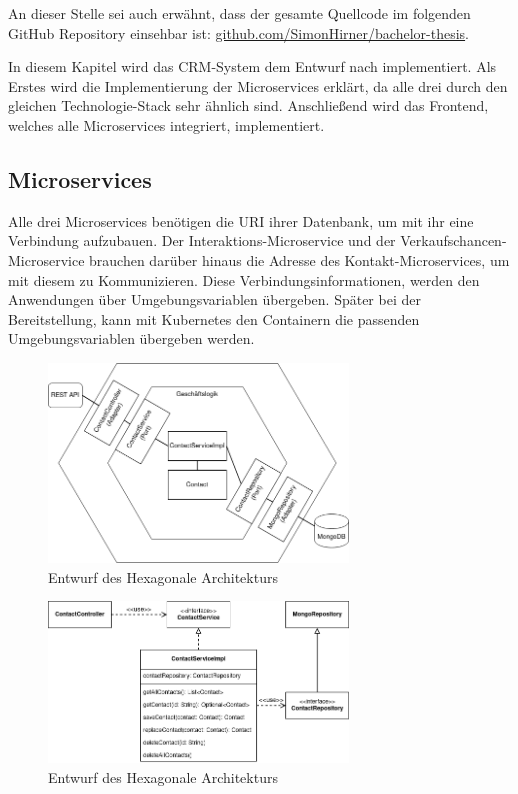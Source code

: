 An dieser Stelle sei auch erwähnt, dass der gesamte Quellcode im folgenden GitHub Repository einsehbar ist: \href{https://github.com/SimonHirner/bachelor-thesis}{github.com/SimonHirner/bachelor-thesis}.

In diesem Kapitel wird das CRM-System dem Entwurf nach implementiert. Als Erstes wird die Implementierung der Microservices erklärt, da alle drei durch den gleichen Technologie-Stack sehr ähnlich sind. Anschließend wird das Frontend, welches alle Microservices integriert, implementiert.

\subsection{Microservices}

Alle drei Microservices benötigen die \ac{URI} ihrer Datenbank, um mit ihr eine Verbindung aufzubauen. Der Interaktions-Microservice und der Verkaufschancen-Microservice brauchen darüber hinaus die Adresse des Kontakt-Microservices, um mit diesem zu Kommunizieren. Diese Verbindungsinformationen, werden den Anwendungen über Umgebungsvariablen übergeben. Später bei der Bereitstellung, kann mit Kubernetes den Containern die passenden Umgebungsvariablen übergeben werden.

\begin{figure}[H] 
    \centering
    \includegraphics[width=0.71\textwidth]{figures/HexagonalDesign.png}
    \caption{Entwurf des \acp{Hexagonale Architektur}}
    \label{fig:CRMENTWURF}
\end{figure}

\begin{figure}[H] 
    \centering
    \includegraphics[width=0.71\textwidth]{figures/UMLKlassenDiagram.png}
    \caption{Entwurf des \acp{Hexagonale Architektur}}
    \label{fig:CRMENTWURF}
\end{figure}

